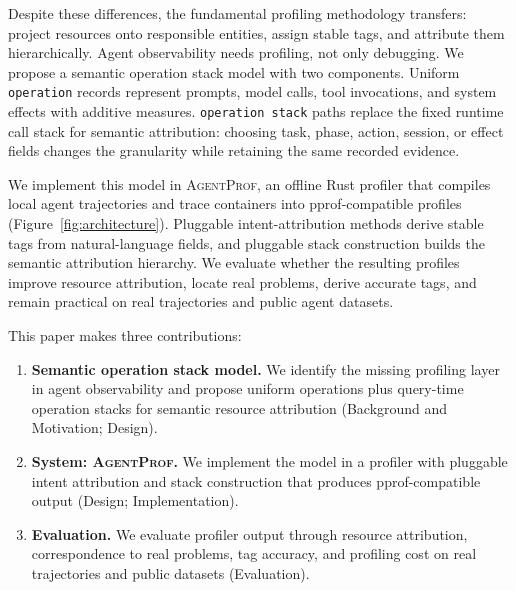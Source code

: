 \documentclass[letterpaper]{article}
\newcommand{\sys}{\textsc{AgentProf}\xspace}
\newcommand{\operation}{\texttt{operation}\xspace}
\newcommand{\opstack}{\texttt{operation stack}\xspace}
\begin{document}
Despite these differences, the fundamental profiling methodology transfers:
project resources onto responsible entities, assign stable tags, and attribute
them hierarchically. Agent observability needs profiling, not only debugging.
We propose a semantic operation stack model with two components. Uniform
\operation{} records represent prompts, model calls, tool invocations, and
system effects with additive measures. \opstack{} paths replace the fixed
runtime call stack for semantic attribution: choosing task, phase, action,
session, or effect fields changes the granularity while retaining the same
recorded evidence.

We implement this model in \sys, an offline Rust profiler that compiles local
agent trajectories and trace containers into pprof-compatible profiles
(Figure~\ref{fig:architecture}). Pluggable intent-attribution methods derive
stable tags from natural-language fields, and pluggable stack construction
builds the semantic attribution hierarchy. We evaluate whether the resulting
profiles improve resource attribution, locate real problems, derive accurate
tags, and remain practical on real trajectories and public agent datasets.

This paper makes three contributions:

\begin{enumerate}
\item \textbf{Semantic operation stack model.}
  We identify the missing profiling layer in agent observability and propose
  uniform operations plus query-time operation stacks for semantic resource
  attribution (Background and Motivation; Design).
\item \textbf{System: \sys.}
  We implement the model in a profiler with pluggable intent attribution and
  stack construction that produces pprof-compatible output (Design;
  Implementation).
\item \textbf{Evaluation.}
  We evaluate profiler output through resource attribution, correspondence to
  real problems, tag accuracy, and profiling cost on real trajectories and
  public datasets (Evaluation).
\end{enumerate}
\end{document}
